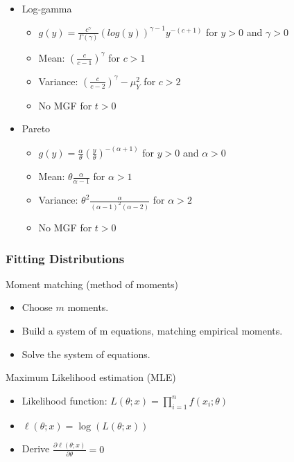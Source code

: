\documentclass{article}
\begin{document}
\begin{itemize}
\begin{itemize}
    \end{itemize}
    \item Log-gamma
    \begin{itemize}
        \item $g(y) = \frac{c^\gamma}{\Gamma(\gamma)}(log(y))^{\gamma-1} y^{-(c+1)}$ \hspace{1cm} for $y>0$ and $\gamma>0$
        \item Mean: $(\frac{c}{c-1})^\gamma$ \hspace{1cm} for $c>1$
        \item Variance: $(\frac{c}{c-2})^\gamma - \mu^2_Y$ \hspace{1cm} for $c>2$
        \item No MGF for $t > 0$
    \end{itemize}
    \item Pareto
        \begin{itemize}
        \item $g(y) = \frac{\alpha}{\theta}(\frac{y}{\theta})^{-(\alpha+1)}$ \hspace{1cm} for $y>0$ and $\alpha>0$
        \item Mean: $\theta \frac{\alpha}{\alpha-1}$ \hspace{1cm} for $\alpha>1$
        \item Variance: $\theta^2 \frac{\alpha}{(\alpha-1)^2 (\alpha-2)}$ \hspace{1cm} for $\alpha>2$
        \item No MGF for $t > 0$
    \end{itemize}
\end{itemize}



\subsubsection{Fitting Distributions}

Moment matching (method of moments)
\begin{itemize}
    \item Choose $m$ moments.
    \item Build a system of m equations, matching empirical moments.
    \item Solve the system of equations.
\end{itemize}



\noindent Maximum Likelihood estimation (MLE)

\begin{itemize}
    \item Likelihood function: $L(\theta;x) = \prod_{i=1}^n f(x_i;\theta)$
    \item $\ell(\theta;x) = \log(L(\theta;x))$
    \item Derive $\frac{\partial \ell(\theta;x)}{\partial \theta}= 0$
\end{itemize}
\end{document}
